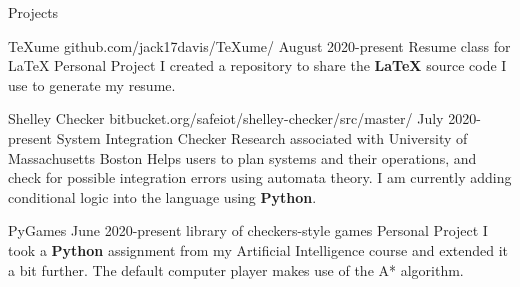 \documentclass{resume} %
\begin{document}
\begin{Section} {Projects}
	\begin{Project} {TeXume}
		{
			{github.com/jack17davis/TeXume/}}
		{August 2020-present}
		{Resume class for LaTeX}
		{Personal Project}
		I created a repository to share the \textbf{LaTeX} source code I use to generate my resume.
	\end{Project}

	\begin{Project} {Shelley Checker}
		{
		{bitbucket.org/safeiot/shelley-checker/src/master/}}
		{July 2020-present}
		{System Integration Checker}
		{Research associated with University of Massachusetts Boston}
		Helps users to plan systems and their operations, and check for possible integration errors using automata theory. I am currently adding conditional logic into the language using \textbf{Python}. 
	\end{Project}

	\begin{Project} {PyGames}
		{}
		{June 2020-present}
		{library of checkers-style games}
		{Personal Project}
		I took a \textbf{Python} assignment from my Artificial Intelligence course and extended it a bit further. The default computer player makes use of the A* algorithm.
	\end{Project}
	
\end{Section}
\end{document}
